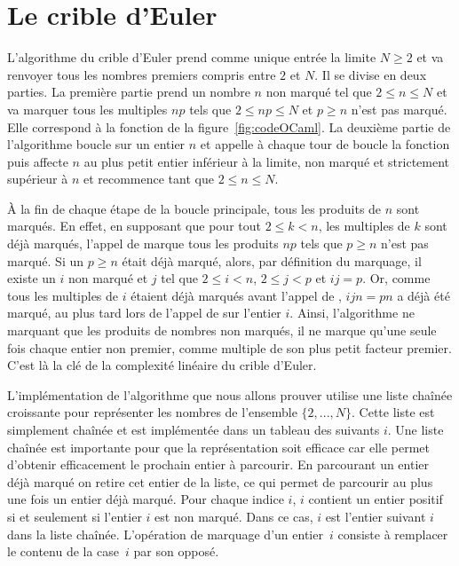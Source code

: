 \documentclass[a4paper]{easychair}
\newcommand\arr[1]{\ocamlf{arr[}#1\ocamlf{]}}
\begin{document}
\section{Le crible d'Euler}
\label{sec:algo}

L'algorithme du crible d'Euler prend comme unique entrée la limite $N \geq 2$
et va renvoyer tous les nombres premiers compris entre $2$ et $N$.
Il se divise en deux parties.
La première partie prend un nombre $n$ non marqué
tel que $2 \leq n \leq N$ et va marquer tous les multiples $np$ tels que
$2 \leq np \leq N$ et $p \geq n$ n'est pas marqué.
Elle correspond à la fonction
 de la figure~\ref{fig:codeOCaml}.
La deuxième partie de l'algorithme boucle sur un entier $n$ et appelle
à chaque tour de boucle la fonction  puis
affecte $n$ au plus petit entier inférieur à la limite,
non marqué et strictement supérieur à $n$
et recommence tant que $2 \leq n \leq N$.

À la fin de chaque étape de la boucle principale, tous les produits de $n$
sont marqués. En effet, en supposant que pour tout $2 \leq k < n$,
les multiples de $k$ sont déjà marqués, l'appel de 
marque tous les produits $np$ tels que $p \geq n$ n'est pas marqué.
Si un $p \geq n$ était déjà marqué,
alors, par définition du marquage, il existe un $i$ non marqué et $j$ tel que
$2 \leq i < n$, $2 \leq j < p$ et $ij = p$.
Or, comme tous les multiples de $i$
étaient déjà marqués avant l'appel de , $ijn = pn$
a déjà été marqué, au plus tard lors de l'appel de 
sur l'entier $i$.
Ainsi, l'algorithme ne marquant que les produits de nombres non marqués, il ne
marque qu'une seule fois chaque entier non premier, comme multiple de
son plus petit facteur premier. C'est là la clé de la complexité
linéaire du crible d'Euler.


L'implémentation de l'algorithme que nous allons prouver utilise une liste
chaînée croissante pour représenter les nombres de l'ensemble $\{2,...,N\}$.
Cette liste est simplement chaînée et est implémentée dans un tableau
des suivants \arr{$i$}.
Une liste chaînée est importante pour que la représentation soit efficace
car elle permet d'obtenir efficacement le prochain entier à parcourir.
En parcourant un entier déjà marqué on retire cet entier de la liste,
ce qui permet de parcourir au plus une fois un entier déjà marqué.
Pour chaque indice $i$, \arr{$i$} contient un entier positif
si et seulement si l'entier $i$ est non marqué.
Dans ce cas, \arr{$i$} est l'entier suivant $i$ dans la liste chaînée.
L'opération de marquage d'un entier~$i$ consiste à remplacer le
contenu de la case~$i$ par son opposé.
\end{document}
